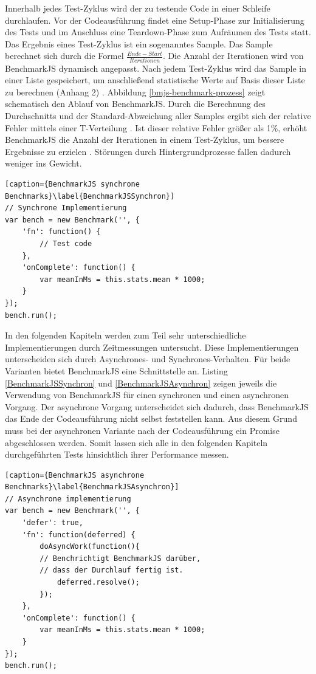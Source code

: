 Innerhalb jedes Test-Zyklus wird der zu testende Code in einer Schleife durchlaufen. Vor der Codeausführung findet eine Setup-Phase zur Initialisierung des Tests und im Anschluss eine Teardown-Phase zum Aufräumen des Tests statt. Das Ergebnis eines Test-Zyklus ist ein sogenanntes Sample. Das Sample berechnet sich durch die Formel $ \frac{Ende - Start}{Iterationen} $. Die Anzahl der Iterationen wird von BenchmarkJS dynamisch angepasst. Nach jedem Test-Zyklus wird das Sample in einer Liste gespeichert, um anschließend statistische Werte auf Basis dieser Liste zu berechnen (Anhang 2) \cite{BenchmarkJSQuelltext}\cite{UncertaintyCalculations}. Abbildung \ref{bmjs-benchmark-prozess} zeigt schematisch den Ablauf von BenchmarkJS. Durch die Berechnung des Durchschnitts und der Standard-Abweichung aller Samples ergibt sich der relative Fehler mittels einer T-Verteilung \cite[S. 440ff.]{Papula2001}. Ist dieser relative Fehler größer als 1\%, erhöht BenchmarkJS die Anzahl der Iterationen in einem Test-Zyklus, um bessere Ergebnisse zu erzielen \cite{BenchmarkJSQuelltext}. Störungen durch Hintergrundprozesse fallen dadurch weniger ins Gewicht. 
\begin{lstlisting}[caption={BenchmarkJS synchrone Benchmarks}\label{BenchmarkJSSynchron}]
// Synchrone Implementierung
var bench = new Benchmark('', {
	'fn': function() {
		// Test code
	},
	'onComplete': function() {
		var meanInMs = this.stats.mean * 1000;
	}
});
bench.run();
\end{lstlisting}
In den folgenden Kapiteln werden zum Teil sehr unterschiedliche Implementierungen durch Zeitmessungen untersucht. Diese Implementierungen unterscheiden sich durch Asynchrones- und Synchrones-Verhalten. Für beide Varianten bietet BenchmarkJS eine Schnittstelle an. Listing \ref{BenchmarkJSSynchron} und \ref{BenchmarkJSAsynchron} zeigen jeweils die Verwendung von BenchmarkJS für einen synchronen und einen asynchronen Vorgang. Der asynchrone Vorgang unterscheidet sich dadurch, dass BenchmarkJS das Ende der Codeausführung nicht selbst feststellen kann. Aus diesem Grund muss bei der asynchronen Variante nach der Codeausführung ein \gls{Promise} abgeschlossen werden. Somit lassen sich alle in den folgenden Kapiteln durchgeführten Tests hinsichtlich ihrer Performance messen. 
\begin{lstlisting}[caption={BenchmarkJS asynchrone Benchmarks}\label{BenchmarkJSAsynchron}]
// Asynchrone implementierung
var bench = new Benchmark('', {
	'defer': true,
	'fn': function(deferred) {
		doAsyncWork(function(){
		// Benchrichtigt BenchmarkJS darüber,
		// dass der Durchlauf fertig ist.
			deferred.resolve();
		});
	},
	'onComplete': function() {
		var meanInMs = this.stats.mean * 1000;
	}
});
bench.run();
\end{lstlisting}
